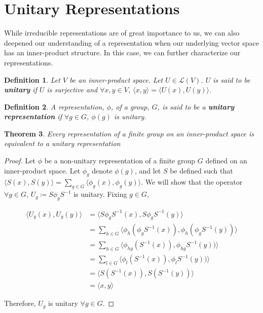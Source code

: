 \documentclass[10pt]{ucthesis}
\newtheorem{definition}{Definition}[chapter]
\newtheorem{theorem}[definition]{Theorem}
\begin{document}
\section{Unitary Representations}

While irreducible representations are of great importance to us, we can also deepened our understanding of a representation when our underlying vector space has an inner-product structure. In this case, we can further characterize our representations. 

\begin{definition}
	Let $V$ be an inner-product space. Let $U \in \mathcal{L}(V)$. $U$ is said to be \textbf{unitary} if $U$ is surjective and $\forall x,y \in V$, $\langle x , y \rangle = \langle U(x) , U(y) \rangle$.
\end{definition}

\begin{definition}
	A representation, $\phi$, of a group, $G$, is said to be a \textbf{unitary representation} if $\forall g\in G$, $\phi(g)$ is unitary.
\end{definition}

\begin{theorem}
	Every representation of a finite group on an inner-product space is equivalent to a unitary representation
\end{theorem}

\begin{proof} Let $\phi$ be a non-unitary representation of a finite group $G$ defined on an inner-product space. Let $\phi_g$ denote $\phi(g)$, and let $S$ be defined such that $\langle S(x) , S(y) \rangle = \sum_{g \in G} \langle \phi_g (x) , \phi_g (y) \rangle$. We will show that the operator $\forall g \in G$, $U_g \coloneq S\phi_gS^{-1}$ is unitary. Fixing $g\in G$,


\begin{equation}
	\begin{aligned}
		\langle U_g(x) , U_g(y) \rangle &= \langle S\phi_gS^{-1}(x) , S\phi_gS^{-1}(y)\rangle \\
									&= \sum_{h \in G} \langle \phi_h(\phi_gS^{-1}(x)) , \phi_h(\phi_gS^{-1}(y))\rangle \\
									&= \sum_{h\in G} \langle \phi_{hg}(S^{-1}(x)) , \phi_{hg}S^{-1}(y))\rangle \\
									&= \sum_{l\in G} \langle \phi_{l}(S^{-1}(x)) , \phi_{l}S^{-1}(y))\rangle \\
									&= \langle S(S^{-1}(x)) , S(S^{-1}(y))\rangle \\
									&= \langle x , y \rangle 
	\end{aligned}
\end{equation}

Therefore, $U_g$ is unitary $\forall g \in G$. \end{proof}
\end{document}
